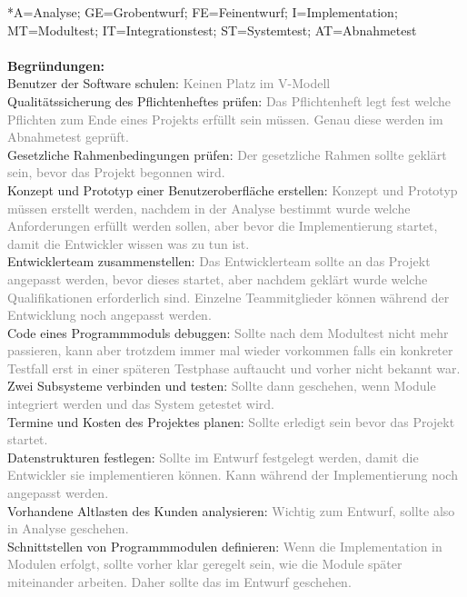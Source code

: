 \documentclass[a4paper,11pt]{scrartcl}
\begin{document}
	*A=Analyse; GE=Grobentwurf; FE=Feinentwurf; I=Implementation; MT=Modultest; IT=Integrationstest; ST=Systemtest; AT=Abnahmetest\\
	\\\textbf{Begründungen:}\\
	Benutzer der Software schulen: \textcolor{gray}{Keinen Platz im V-Modell}\\
	Qualitätssicherung des Pflichtenheftes prüfen: \textcolor{gray}{Das Pflichtenheft legt fest welche Pflichten zum Ende eines Projekts erfüllt sein müssen. Genau diese werden im Abnahmetest geprüft.}\\
	Gesetzliche Rahmenbedingungen prüfen: \textcolor{gray}{Der gesetzliche Rahmen sollte geklärt sein, bevor das Projekt begonnen wird.}\\
	Konzept und Prototyp einer Benutzeroberfläche erstellen: \textcolor{gray}{Konzept und Prototyp müssen erstellt werden, nachdem in der Analyse bestimmt wurde welche Anforderungen erfüllt werden sollen, aber bevor die Implementierung startet, damit die Entwickler wissen was zu tun ist.} \\
	Entwicklerteam zusammenstellen: \textcolor{gray}{Das Entwicklerteam sollte an das Projekt angepasst werden, bevor dieses startet, aber nachdem geklärt wurde welche Qualifikationen erforderlich sind. Einzelne Teammitglieder können während der Entwicklung noch angepasst werden.}\\
	Code eines Programmmoduls debuggen: \textcolor{gray}{Sollte nach dem Modultest nicht mehr passieren, kann aber trotzdem immer mal wieder vorkommen falls ein konkreter Testfall erst in einer späteren Testphase auftaucht und vorher nicht bekannt war.}\\			
 	Zwei Subsysteme verbinden und testen: \textcolor{gray}{Sollte dann geschehen, wenn Module integriert werden und das System getestet wird.}\\			
 	Termine und Kosten des Projektes planen: \textcolor{gray}{Sollte erledigt sein bevor das Projekt startet.}\\
	Datenstrukturen festlegen: \textcolor{gray}{Sollte im Entwurf festgelegt werden, damit die Entwickler sie implementieren können. Kann während der Implementierung noch angepasst werden.}\\				
	Vorhandene Altlasten des Kunden analysieren: \textcolor{gray}{Wichtig zum Entwurf, sollte also in Analyse geschehen.}\\			
	Schnittstellen von Programmmodulen definieren: \textcolor{gray}{Wenn die Implementation in Modulen erfolgt, sollte vorher klar geregelt sein, wie die Module später miteinander arbeiten. Daher sollte das im Entwurf geschehen.}\\			
\end{document}
